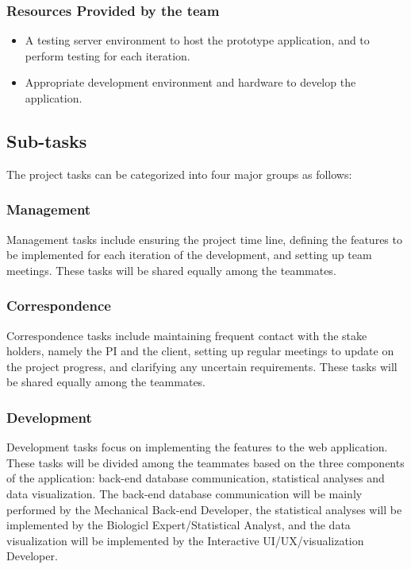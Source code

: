 \documentclass[10pt,twocolumn,letterpaper]{article}
\begin{document}
                \subsubsection{Resources Provided by the team}
                \begin{itemize}
                  \item A testing server environment to host the prototype application, and to perform testing for each iteration.
                  \item Appropriate development environment and hardware to develop the application.
                \end{itemize}
            \subsection{Sub-tasks}
            The project tasks can be categorized into four major groups as follows:
                \subsubsection{Management}
                Management tasks include ensuring the project time line, defining the features to be implemented for each iteration of the development, and setting up team meetings. 
                These tasks will be shared equally among the teammates.
                \subsubsection{Correspondence}
                Correspondence tasks include maintaining frequent contact with the stake holders, namely the PI and the client, setting up regular meetings to update on the project progress, and clarifying any uncertain requirements. 
                These tasks will be shared equally among the teammates.
                \subsubsection{Development}
                Development tasks focus on implementing the features to the web application. These tasks will be divided among the teammates based on the three components of the application: back-end database communication, statistical analyses and data visualization. 
                The back-end database communication will be mainly performed by the Mechanical Back-end Developer, the statistical analyses will be implemented by the Biologicl Expert/Statistical Analyst, and the data visualization will be implemented by the Interactive UI/UX/visualization Developer.
\end{document}
